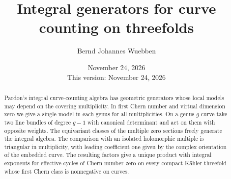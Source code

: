 \documentclass[11pt]{amsart}
\title[Integral generators for curve counting]{Integral generators for curve counting on threefolds}
\author{Bernd Johannes Wuebben}
\date{November 24, 2026\\This version: November 24, 2026}
\theoremstyle{remark}\newtheorem{example}[theorem]{Example}
\begin{document}
\begin{abstract}
Pardon's integral curve-counting algebra has geometric generators
whose local models may depend on the covering multiplicity. In first
Chern number and virtual dimension zero we give a single model in
each genus for all multiplicities. On a genus-$g$ curve take two line
bundles of degree $g-1$ with canonical determinant and act on them
with opposite weights. The equivariant classes of the multiple zero
sections freely generate the integral algebra. The comparison with an
isolated holomorphic multiple is triangular in multiplicity, with
leading coefficient one given by the complex orientation of the embedded
curve. The resulting factors give a unique product with integral
exponents for effective cycles of Chern number zero on every compact
Kähler threefold whose first Chern class is nonnegative on curves.
\end{abstract}
\maketitle






\end{document}
